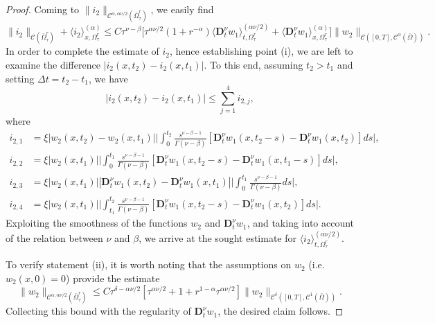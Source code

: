 \documentclass[reqno]{amsart}
\def\C {\mathcal{C}}
\theoremstyle{definition}
\numberwithin{equation}{section}
\begin{document}
\begin{proof}
\noindent
Coming to $\|i_2\|_{\C^{\alpha,\alpha\nu/2}(\bar{\Omega}_{\tau}^{r})}$, we easily find
\[
\|i_2\|_{\C(\bar{\Omega}_{\tau}^{r})}+\langle i_2\rangle_{x,\Omega_{\tau}^{r}}^{(\alpha)}
\leq C\tau^{\nu-\beta}\Big[\tau^{\alpha\nu/2}(1+r^{-\alpha})\langle\mathbf{D}_{t}^{\nu}w_1\rangle_{t,\Omega_{\tau}^{r}}^{(\alpha\nu/2)}
+
\langle\mathbf{D}_{t}^{\nu}w_1\rangle_{x,\Omega_{\tau}^{r}}^{(\alpha)}
\Big]\|w_2\|_{\C([0,T],\C^{\alpha}(\bar{\Omega}))}.
\]
In order to complete the estimate of $i_2$, hence establishing
point (i), we are left to examine the difference $|i_2(x,t_2)-i_2(x,t_1)|$. To this end, assuming $t_2>t_1$ and setting $\Delta t=t_2-t_1$, we have
\[
|i_2(x,t_2)-i_2(x,t_1)|\leq \sum_{j=1}^{4}i_{2,j},
\]
where
\begin{align*}
i_{2,1}&=\xi|w_{2}(x,t_2)-w_{2}(x,t_1)|\Big|\int_{0}^{t_2}\frac{s^{\nu-\beta-1}}{\Gamma(\nu-\beta)}[\mathbf{D}_{t}^{\nu}w_1(x,t_{2}-s)-
\mathbf{D}_{t}^{\nu}w_1(x,t_{2})]ds\Big|,\\
i_{2,2}&=\xi|w_{2}(x,t_1)|\Big|\int_{0}^{t_1}\frac{s^{\nu-\beta-1}}{\Gamma(\nu-\beta)}[\mathbf{D}_{t}^{\nu}w_1(x,t_{2}-s)-
\mathbf{D}_{t}^{\nu}w_1(x,t_{1}-s)]ds\Big|,\\
i_{2,3}&=\xi|w_{2}(x,t_1)||\mathbf{D}_{t}^{\nu}w_1(x,t_{2})-\mathbf{D}_{t}^{\nu}w_1(x,t_{1})|\bigg|\int_{0}^{t_1}\frac{s^{\nu-\beta-1}}{\Gamma(\nu-\beta)}ds\bigg|,\\
i_{2,4}&=\xi|w_{2}(x,t_1)|\bigg|\int_{t_1}^{t_2}\frac{s^{\nu-\beta-1}}{\Gamma(\nu-\beta)}[\mathbf{D}_{t}^{\nu}w_1(x,t_{2}-s)-\mathbf{D}_{t}^{\nu}w_1(x,t_{2})]ds\bigg|.
\end{align*}
Exploiting the smoothness of the functions $w_2$ and $\mathbf{D}_{t}^{\nu}w_1$, and taking into account of the relation between $\nu$ and $\beta$, we arrive at the sought estimate
for $\langle i_2\rangle_{t,\Omega_{\tau}^{r}}^{(\alpha\nu/2)}$.

To verify statement (ii), it is worth noting that
the assumptions on $w_2$ (i.e. $w_2(x,0)=0$) provide the estimate
\[
\|w_2\|_{\C^{\alpha,\alpha\nu/2}(\bar{\Omega}_{\tau}^{r})}\leq C\tau^{\delta-\alpha\nu/2}
[\tau^{\alpha\nu/2}+1+r^{1-\alpha}\tau^{\alpha\nu/2}]\|w_2\|_{\C^{\delta}([0,T],\C^{1}(\bar{\Omega}))}.
\]
Collecting this bound with the regularity of $\mathbf{D}_{t}^{\nu}w_1$, the desired claim follows.


\end{proof}
\end{document}
